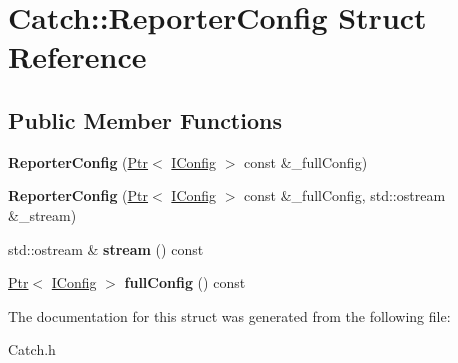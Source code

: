 \hypertarget{struct_catch_1_1_reporter_config}{\section{Catch\-:\-:Reporter\-Config Struct Reference}
\label{struct_catch_1_1_reporter_config}
}
\subsection*{Public Member Functions}
\begin{DoxyCompactItemize}
\item 
\hypertarget{struct_catch_1_1_reporter_config_aae30a67f41d2b2fecd57f42f54649caa}{{\bfseries Reporter\-Config} (\hyperlink{class_catch_1_1_ptr}{Ptr}$<$ \hyperlink{struct_catch_1_1_i_config}{I\-Config} $>$ const \&\-\_\-full\-Config)}\label{struct_catch_1_1_reporter_config_aae30a67f41d2b2fecd57f42f54649caa}

\item 
\hypertarget{struct_catch_1_1_reporter_config_aadf290549fd003a753b938d824e75667}{{\bfseries Reporter\-Config} (\hyperlink{class_catch_1_1_ptr}{Ptr}$<$ \hyperlink{struct_catch_1_1_i_config}{I\-Config} $>$ const \&\-\_\-full\-Config, std\-::ostream \&\-\_\-stream)}\label{struct_catch_1_1_reporter_config_aadf290549fd003a753b938d824e75667}

\item 
\hypertarget{struct_catch_1_1_reporter_config_a6ac1cce9cdc14d4df5d3cea096c0910e}{std\-::ostream \& {\bfseries stream} () const }\label{struct_catch_1_1_reporter_config_a6ac1cce9cdc14d4df5d3cea096c0910e}

\item 
\hypertarget{struct_catch_1_1_reporter_config_a1d12c4a0a6c0c5619a3c8a12cf6fbf1d}{\hyperlink{class_catch_1_1_ptr}{Ptr}$<$ \hyperlink{struct_catch_1_1_i_config}{I\-Config} $>$ {\bfseries full\-Config} () const }\label{struct_catch_1_1_reporter_config_a1d12c4a0a6c0c5619a3c8a12cf6fbf1d}

\end{DoxyCompactItemize}


The documentation for this struct was generated from the following file\-:\begin{DoxyCompactItemize}
\item 
Catch.\-h\end{DoxyCompactItemize}
